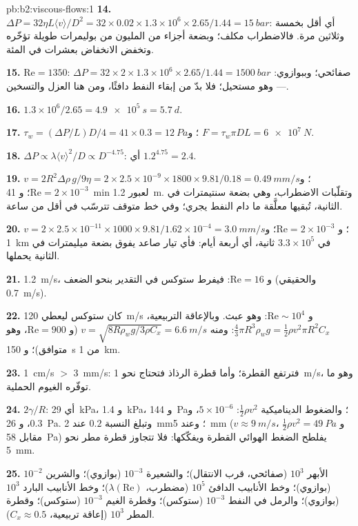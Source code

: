 \begin{solution}{pb:b2:viscous-flows:1}
\textbf{14.} $\Delta P = 32\eta L\langle v\rangle/D^2 = 32 \times 0.02 \times 1.3 \times 10^6
\times 2.65/1.44 = \qty{15}{bar}$: أي أقل بخمسة وثلاثين مرة. فالاضطراب
مكلف؛ وبضعة أجزاء من المليون من بوليمرات طويلة تؤخّره وتخفض
الانخفاض بعشرات في المئة.

\textbf{15.} $\mathrm{Re} = 1350$: صفائحي؛ وببوازوي: $\Delta P = 32 \times 2 \times 1.3 \times
10^6 \times 2.65/1.44 = \qty{1500}{bar}$ --- وهو مستحيل؛ فلا بدّ من إبقاء
النفط دافئًا، ومن هنا العزل والتسخين.

\textbf{16.} $1.3 \times 10^6/2.65 = \qty{4.9e5}{s} = \qty{5.7}{d}$.

\textbf{17.} $\tau_w = (\Delta P/L)D/4 = 41 \times 0.3 = \qty{12}{Pa}$؛ و $F = \tau_w\pi DL =
\qty{6e7}{N}$.

\textbf{18.} $\Delta P \propto \lambda\langle v\rangle^2/D \propto D^{-4.75}$: أي $1.2^{4.75} = 2.4$.

\textbf{19.} $v = 2R^2\Delta\rho\,g/9\eta = 2 \times 2.5 \times 10^{-9} \times 1800 \times 9.81/
0.18 = \qty{0.49}{mm/s}$؛ و $\mathrm{Re} = 2 \times 10^{-3}$؛ و \qty{41}{min} لعبور
\qty{1.2}{m}. وتقلّبات الاضطراب، وهي بضعة سنتيمترات في الثانية،
تُبقيها معلَّقة ما دام النفط يجري؛ وفي خط متوقف تترسّب في
أقل من ساعة.

\textbf{20.} $v = 2 \times 2.5 \times 10^{-11} \times 1000 \times 9.81/1.62 \times 10^{-4} =
\qty{3.0}{mm/s}$؛ و $\mathrm{Re} = 2 \times 10^{-3}$؛ و \qty{1}{km} في $3.3 \times 10^5$ ثانية، أي أربعة
أيام: فأي تيار صاعد يفوق بضعة ميليمترات في الثانية يحملها.

\textbf{21.} \qty{1.2}{m/s}، و $\mathrm{Re} = 16$: فيفرط ستوكس في التقدير بنحو
الضعف (والحقيقي \qty{0.7}{m/s}).

\textbf{22.} كان ستوكس ليعطي \qty{120}{m/s} و $\mathrm{Re} \sim 10^4$: وهو عبث.
وبالإعاقة التربيعية، $\tfrac43\pi R^3\rho_wg = \tfrac12\rho v^2\pi R^2C_x$: ومنه $v = \sqrt{8R
\rho_wg/3\rho C_x} = \qty{6.6}{m/s}$ (و $\mathrm{Re} = 900$، وهو متوافق)؛ و \qty{150}{s} من
\qty{1}{km}.

\textbf{23.} \qty{1}{cm/s} $>$ \qty{3}{mm/s}: فترتفع القطرة؛ وأما قطرة الرذاذ
فتحتاج نحو \qty{1}{m/s}، وهو ما توفّره الغيوم الحملية.

\textbf{24.} $2\gamma/R$: أي \qty{29}{kPa}، و \qty{1.4}{kPa}، و \qty{144}{Pa}؛ والضغوط
الديناميكية $\tfrac12\rho v^2$: $5 \times 10^{-6}$، و $0.3$، و \qty{26}{Pa}. وتبلغ النسبة
$0.2$ عند \qty{2}{mm}؛ وعند \qty{5}{mm} ($v \approx \qty{9}{m/s}$، و $\tfrac12\rho v^2 =
\qty{49}{Pa}$ مقابل \qty{58}{Pa}) يفلطح الضغط الهوائي
القطرة ويفكّكها: فلا تتجاوز قطرة مطر نحو \qty{5}{mm}.

\textbf{25.} الأبهر $10^3$ (صفائحي، قرب الانتقال)؛ والشعيرة $10^{-3}$
(بوازوي)؛ والشرين $10^{-2}$ (بوازوي)؛ وخط الأنابيب الدافئ $10^5$
(مضطرب، $\lambda(\mathrm{Re})$)؛ وخط الأنابيب البارد $10^3$ (بوازوي)؛ والرمل في
النفط $10^{-3}$ (ستوكس)؛ وقطرة الغيم $10^{-3}$ (ستوكس)؛ وقطرة المطر $10^3$
(إعاقة تربيعية، $C_x \approx 0.5$).
\end{solution}
